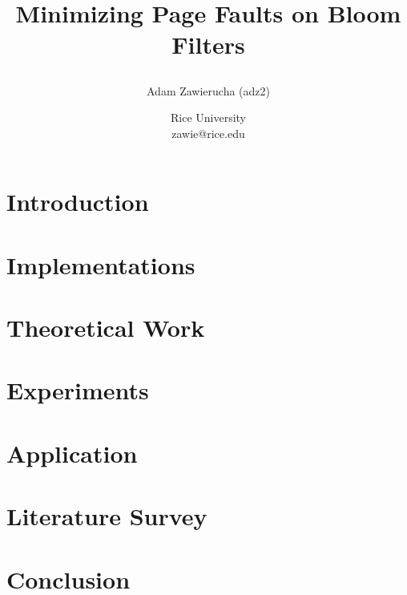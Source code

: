 \documentclass[a4paper]{article}
\title{Minimizing Page Faults on Bloom Filters
\author{Adam Zawierucha (adz2)}

\date{
	Rice University \\ zawie@rice.edu}%
}
\theoremstyle{plain}
\theoremstyle{definition}
\begin{document}
	\maketitle
	
	\begin{abstract}
		
	\end{abstract}
	

	\section{Introduction}
	

	\section{Implementations}
	

	\section{Theoretical Work}
	

	\section{Experiments}
	

	\section{Application}
	

	\section{Literature Survey}
	

	\section{Conclusion}
	


	
	
\end{document}
